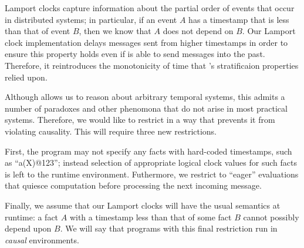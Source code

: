 
Lamport clocks capture information about the partial order of events
that occur in distributed systems; in particular, if an event $A$ has
a timestamp that is less than that of event $B$, then we know that $A$
does not depend on $B$.  Our Lamport clock implementation delays
messages sent from higher timestamps in order to ensure this property
holds even if  is able to send messages into the
past.  Therefore, it reintroduces the monotonicity of time that \slang's
stratificaion properties relied upon.

Although \lang allows us to reason about arbitrary temporal systems,
this admits a number of paradoxes and other phenomona that do not
arise in most practical systems.  Therefore, we would like to restrict
\lang in a way that prevents it from violating causality.  This will
require three new restrictions.

First, the program may not specify any facts with hard-coded
timestamps, such as ``a(X)@123''; instead selection of appropriate
logical clock values for such facts is left to the runtime
environment.  Futhermore, we restrict \lang to ``eager'' evaluations
that quiesce computation before processing the next incoming message.

Finally, we assume that our Lamport clocks will have the usual
semantics at runtime: a fact $A$ with a timestamp less than that of
some fact $B$ cannot possibly depend upon $B$.  We will say that \lang
programs with this final restriction run in {\em causal} environments.

